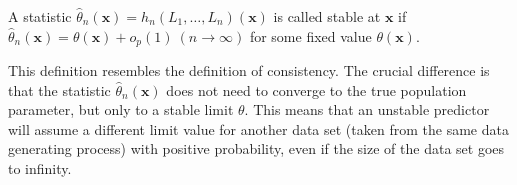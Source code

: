 \begin{definition} \label{stability}
A statistic $\hat{\theta}_{n}(\mathbf{x}) = h_{n}(L_{1},\dots, L_{n})(\mathbf{x})$ is called stable at $\mathbf{x}$ if $\hat{\theta}_{n}(\mathbf{x}) = \theta(\mathbf{x}) + o_{p}(1) \: (n \rightarrow \infty)$ for some fixed value $\theta(\mathbf{x})$.
\end{definition}

\noindent
This definition resembles the definition of consistency. The crucial difference is that the statistic $\hat{\theta}_n(\mathbf{x})$ does not need to converge to the true population parameter, but only to a stable limit $\theta$. This means that an unstable predictor will assume a different limit value for another data set (taken from the same data generating process) with positive probability, even if the size of the data set goes to infinity. 